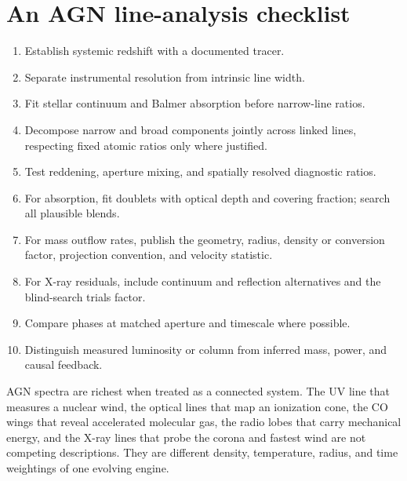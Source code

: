 \section{An AGN line-analysis checklist}

\begin{enumerate}
 \item Establish systemic redshift with a documented tracer.
 \item Separate instrumental resolution from intrinsic line width.
 \item Fit stellar continuum and Balmer absorption before narrow-line ratios.
 \item Decompose narrow and broad components jointly across linked lines,
 respecting fixed atomic ratios only where justified.
 \item Test reddening, aperture mixing, and spatially resolved diagnostic
 ratios.
 \item For absorption, fit doublets with optical depth and covering fraction;
 search all plausible blends.
 \item For mass outflow rates, publish the geometry, radius, density or
 conversion factor, projection convention, and velocity statistic.
 \item For X-ray residuals, include continuum and reflection alternatives and
 the blind-search trials factor.
 \item Compare phases at matched aperture and timescale where possible.
 \item Distinguish measured luminosity or column from inferred mass, power,
 and causal feedback.
\end{enumerate}

AGN spectra are richest when treated as a connected system. The UV line that
measures a nuclear wind, the optical lines that map an ionization cone, the
CO wings that reveal accelerated molecular gas, the radio lobes that carry
mechanical energy, and the X-ray lines that probe the corona and fastest wind
are not competing descriptions. They are different density, temperature,
radius, and time weightings of one evolving engine.
